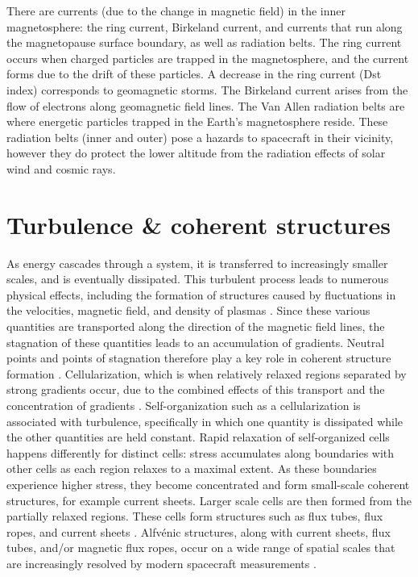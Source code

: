 There are currents (due to the change in magnetic field) in the inner magnetosphere: the ring current, Birkeland current, and currents that run along the magnetopause surface boundary, as well as radiation belts. The ring current occurs when charged particles are trapped in the magnetosphere, and the current forms due to the drift of these particles. A decrease in the ring current (Dst index) corresponds to geomagnetic storms. The Birkeland current arises from the flow of electrons along geomagnetic field lines. The Van Allen radiation belts are where energetic particles trapped in the Earth's magnetosphere reside. These radiation belts (inner and outer) pose a hazards to spacecraft in their vicinity, however they do protect the lower altitude from the radiation effects of solar wind and cosmic rays.


\section{Turbulence \& coherent structures}
As energy cascades through a system, it is transferred to increasingly smaller scales, and is eventually dissipated. This turbulent process leads to numerous physical effects, including the formation of structures caused by fluctuations in the velocities, magnetic field, and density of plasmas \citep{Matthaeus:2015}. Since these various quantities are transported along the direction of the magnetic field lines, the stagnation of these quantities leads to an accumulation of gradients. Neutral points and points of stagnation therefore play a key role in coherent structure formation \citep{Matthaeus:2015}. Cellularization, which is when relatively relaxed regions separated by strong gradients occur, due to the combined effects of this transport and the concentration of gradients \citep{Matthaeus:2015}. Self-organization such as a cellularization is associated with turbulence, specifically in which one quantity is dissipated while the other quantities are held constant. Rapid relaxation of self-organized cells happens differently for distinct cells: stress accumulates along boundaries with other cells as each region relaxes to a maximal extent. As these boundaries experience higher stress, they become concentrated and form small-scale coherent structures, for example current sheets. Larger scale cells are then formed from the partially relaxed regions. These cells form structures such as flux tubes, flux ropes, and current sheets \citep{Matthaeus:2015}. Alfv\'enic structures, along with current sheets, flux tubes, and/or magnetic flux ropes, occur on a wide range of spatial scales that are increasingly resolved by modern spacecraft measurements \citep{Greco:2018, Pecora:2019, Zheng:2018, Artemyev:2019}.

